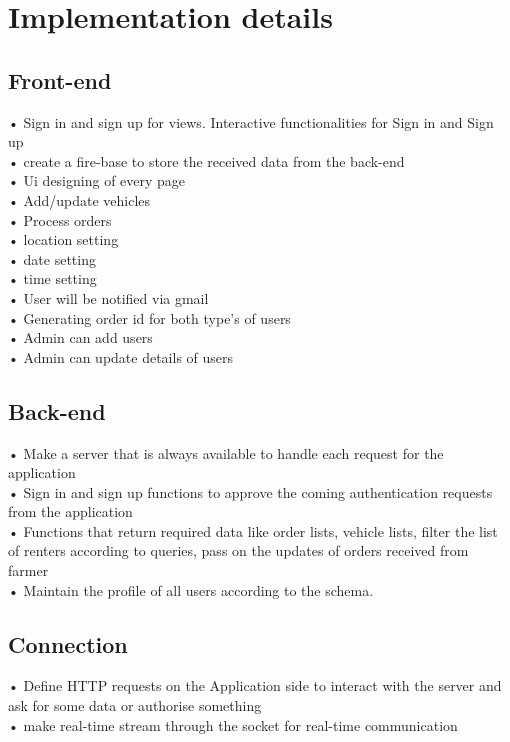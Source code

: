\documentclass[conference]{IEEEtran}
\begin{document}
\section{Implementation details}
\subsection{Front-end}
• Sign in and sign up for views. Interactive functionalities for Sign in and Sign up\\
• create a fire-base to store the received data from the back-end\\
• Ui designing of every page\\
• Add/update vehicles \\
• Process orders\\
• location setting\\ 
• date setting \\
• time setting\\
• User will be notified via gmail\\
• Generating order id for both type's of users\\
• Admin can add users \\
• Admin can update details of users\\

\subsection{Back-end}
• Make a server that is always available to handle each request for the application\\
• Sign in and sign up functions to approve the coming authentication requests from the application\\
• Functions that return required data like order lists, vehicle lists, filter the list of renters according to queries, pass on the updates of orders received from farmer\\
• Maintain the profile of all users according to the schema.\\

\subsection{Connection}
• Define HTTP requests on the Application side to interact with the server and ask for some data or authorise something\\
• make real-time stream through the socket for real-time communication\\
\end{document}
